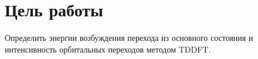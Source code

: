 \section{Цель работы}
Определить энергии возбуждения перехода из основного состояния и интенсивность орбитальных переходов методом TDDFT.
